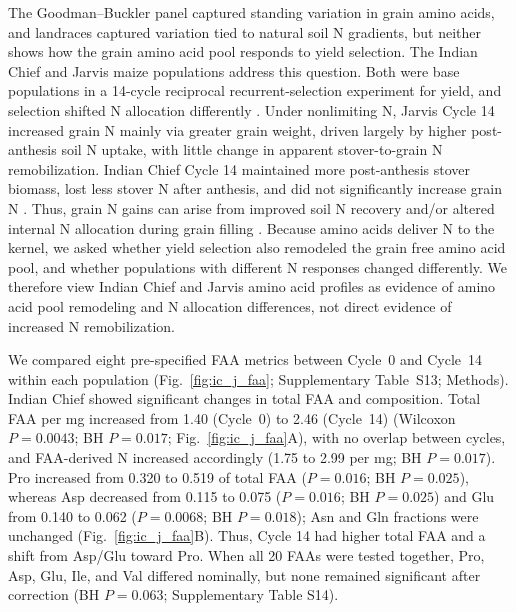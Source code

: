 The Goodman--Buckler panel captured standing variation in grain amino acids, and landraces captured variation tied to natural soil N gradients, but neither shows how the grain amino acid pool responds to yield selection. The Indian Chief and Jarvis maize populations address this question. Both were base populations in a 14-cycle reciprocal recurrent-selection experiment for yield, and selection shifted N allocation differently \citep{Moll1994}. Under nonlimiting N, Jarvis Cycle 14 increased grain N mainly via greater grain weight, driven largely by higher post-anthesis soil N uptake, with little change in apparent stover-to-grain N remobilization. Indian Chief Cycle 14 maintained more post-anthesis stover biomass, lost less stover N after anthesis, and did not significantly increase grain N \citep{Moll1994}. Thus, grain N gains can arise from improved soil N recovery and/or altered internal N allocation during grain filling \citep{Mueller2019NUE}. Because amino acids deliver N to the kernel, we asked whether yield selection also remodeled the grain free amino acid pool, and whether populations with different N responses changed differently. We therefore view Indian Chief and Jarvis amino acid profiles as evidence of amino acid pool remodeling and N allocation differences, not direct evidence of increased N remobilization.

We compared eight pre-specified FAA metrics between Cycle~0 and Cycle~14 within each population (Fig.~\ref{fig:ic_j_faa}; Supplementary Table~S13; Methods). Indian Chief showed significant changes in total FAA and composition. Total FAA per mg increased from 1.40 (Cycle~0) to 2.46 (Cycle~14) (Wilcoxon $P = 0.0043$; BH $P = 0.017$; Fig.~\ref{fig:ic_j_faa}A), with no overlap between cycles, and FAA-derived N increased accordingly (1.75 to 2.99 per mg; BH $P = 0.017$). Pro increased from 0.320 to 0.519 of total FAA ($P = 0.016$; BH $P = 0.025$), whereas Asp decreased from 0.115 to 0.075 ($P = 0.016$; BH $P = 0.025$) and Glu from 0.140 to 0.062 ($P = 0.0068$; BH $P = 0.018$); Asn and Gln fractions were unchanged (Fig.~\ref{fig:ic_j_faa}B). Thus, Cycle 14 had higher total FAA and a shift from Asp/Glu toward Pro. When all 20 FAAs were tested together, Pro, Asp, Glu, Ile, and Val differed nominally, but none remained significant after correction (BH $P = 0.063$; Supplementary Table S14).

